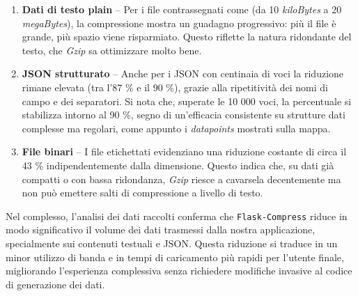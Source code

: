 \begin{enumerate}
    \item \textbf{Dati di testo plain} – Per i file contrassegnati come  (da 10 \textit{kiloBytes} a 20 \textit{megaBytes}), la compressione mostra un guadagno progressivo: più il file è grande, più spazio viene risparmiato. Questo riflette la natura ridondante del testo, che \textit{Gzip} sa ottimizzare molto bene.
  
  \item \textbf{JSON strutturato} – Anche per i JSON con centinaia di voci la riduzione rimane elevata (tra l'87 \% e il 90 \%), grazie alla ripetitività dei nomi di campo e dei separatori. Si nota che, superate le 10 000 voci, la percentuale si stabilizza intorno al 90 \%, segno di un'efficacia consistente su strutture dati complesse ma regolari, come appunto i \textit{datapoints} mostrati sulla mappa.
  
  \item \textbf{File binari} – I file etichettati  evidenziano una riduzione costante di circa il 43 \% indipendentemente dalla dimensione. Questo indica che, su dati già compatti o con bassa ridondanza, \textit{Gzip} riesce a cavarsela decentemente ma non può emettere salti di compressione a livello di testo.
\end{enumerate}

Nel complesso, l'analisi dei dati raccolti conferma che \texttt{Flask-Compress} riduce in modo significativo il volume dei dati trasmessi dalla nostra applicazione, specialmente sui contenuti testuali e JSON. Questa riduzione si traduce in un minor utilizzo di banda e in tempi di caricamento più rapidi per l'utente finale, migliorando l'esperienza complessiva senza richiedere modifiche invasive al codice di generazione dei dati.

